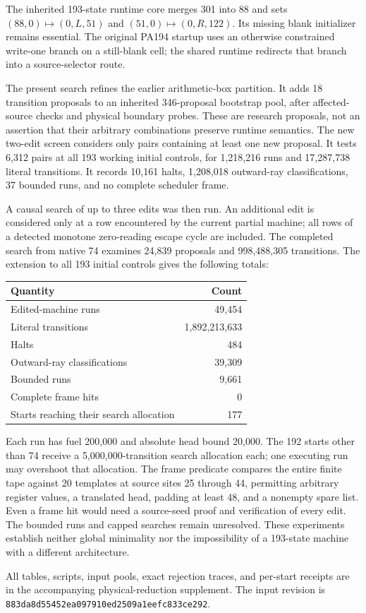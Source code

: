 The inherited 193-state runtime core merges 301 into 88 and sets
$(88,0)\mapsto(0,L,51)$ and $(51,0)\mapsto(0,R,122)$.
Its missing blank initializer remains essential. The original PA194 startup
uses an otherwise constrained write-one branch on a still-blank cell;
the shared runtime redirects that branch into a source-selector route.

The present search refines the earlier arithmetic-box partition. It
adds 18 transition proposals to an inherited 346-proposal bootstrap pool,
after affected-source checks and physical boundary probes. These are
research proposals, not an assertion that their arbitrary combinations
preserve runtime semantics. The new two-edit screen considers only
pairs containing at least one new proposal. It tests 6,312 pairs at all 193
working initial controls, for 1,218,216 runs and 17,287,738 literal
transitions. It records 10,161 halts, 1,208,018 outward-ray classifications,
37 bounded runs, and no complete scheduler frame.

A causal search of up to three edits was then run. An additional edit
is considered only at a row encountered by the current partial machine;
all rows of a detected monotone zero-reading escape cycle are included.
The completed search from native 74 examines 24,839 proposals and
998,488,305 transitions. The extension to all 193 initial controls gives
the following totals:
\begin{center}
\begin{tabular}{lr}
Quantity & Count\\\hline
Edited-machine runs &49,454\\
Literal transitions &1,892,213,633\\
Halts &484\\
Outward-ray classifications &39,309\\
Bounded runs &9,661\\
Complete frame hits &0\\
Starts reaching their search allocation &177
\end{tabular}
\end{center}
Each run has fuel 200,000 and absolute head bound 20,000. The 192 starts
other than 74 receive a 5,000,000-transition search allocation each;
one executing run may overshoot that allocation. The frame predicate
compares the entire finite tape against 20 templates at source sites 25
through 44, permitting arbitrary register values, a translated head,
padding at least 48, and a nonempty spare list. Even a frame hit would
need a source-seed proof and verification of every edit. The bounded
runs and capped searches remain unresolved. These experiments establish
neither global minimality nor the impossibility of a 193-state machine
with a different architecture.

All tables, scripts, input pools, exact rejection traces, and per-start
receipts are in the accompanying physical-reduction supplement. The
input revision is \texttt{883da8d55452ea097910ed2509a1eefc833ce292}.
